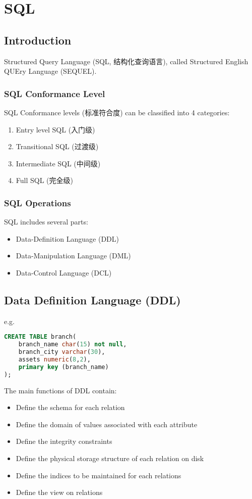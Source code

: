 \newpage
\section{SQL}

\subsection{Introduction}
Structured Query Language (SQL, 结构化查询语言), called Structured English QUEry Language (SEQUEL). 

\subsubsection{SQL Conformance Level}
SQL Conformance levels (标准符合度) can be classified into 4 categories:
\begin{enumerate}
    \item Entry level SQL (入门级)
    \item Transitional SQL (过渡级)
    \item Intermediate SQL (中间级)
    \item Full SQL (完全级)
\end{enumerate}

\subsubsection{SQL Operations}
SQL includes several parts:
\begin{itemize}
    \item Data-Definition Language (DDL)
    \item Data-Manipulation Language (DML)
    \item Data-Control Language (DCL)
\end{itemize}

\subsection{Data Definition Language (DDL)}
e.g. 
\begin{lstlisting}[language=sql]
CREATE TABLE branch(
    branch_name char(15) not null,
    branch_city varchar(30),
    assets numeric(8,2),
    primary key (branch_name)
);
\end{lstlisting}


The main functions of DDL contain:
\begin{itemize}
    \item Define the schema for each relation
    \item Define the domain of values associated with each attribute
    \item Define the integrity constraints
    \item Define the physical storage structure of each relation on disk
    \item Define the indices to be maintained for each relations
    \item Define the view on relations    
\end{itemize}

